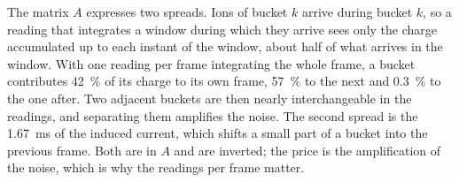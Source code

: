 \documentclass[11pt,a4paper]{article}
\begin{document}
The matrix $A$ expresses two spreads. Ions of bucket $k$ arrive during
bucket $k$, so a reading that integrates a window during which they arrive
sees only the charge accumulated up to each instant of the window, about
half of what arrives in the window. With one reading per frame integrating
the whole frame, a bucket contributes \SI{42}{\percent} of its charge to its
own frame, \SI{57}{\percent} to the next and \SI{0.3}{\percent} to the one
after. Two adjacent buckets are then nearly interchangeable in the readings,
and separating them amplifies the noise. The second spread is the
\SI{1.67}{ms} of the induced current, which shifts a small part of a bucket
into the previous frame. Both are in $A$ and are inverted; the price is the
amplification of the noise, which is why the readings per frame matter.

\end{document}
